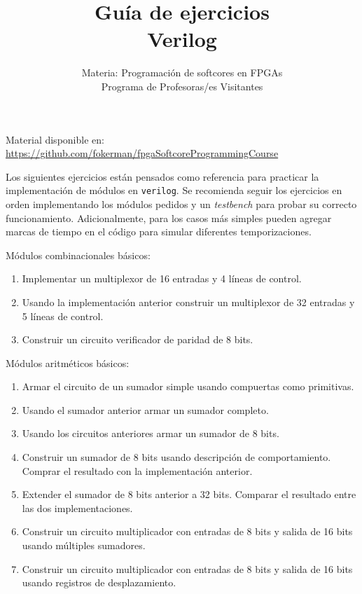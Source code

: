 \documentclass[a4paper,11pt]{article}
\title{Guía de ejercicios\\ 
\large{Verilog}}
\author{Materia: Programación de softcores en FPGAs\\
Programa de Profesoras/es Visitantes}
\date{}
\begin{document}
\maketitle

\begin{center}
    \scriptsize Material disponible en: \url{https://github.com/fokerman/fpgaSoftcoreProgrammingCourse}
\end{center}

\begin{notes}
Los siguientes ejercicios están pensados como referencia para practicar la implementación de módulos en \texttt{verilog}.
Se recomienda seguir los ejercicios en orden implementando los módulos pedidos y un \emph{testbench} para probar su correcto funcionamiento.
Adicionalmente, para los casos más simples pueden agregar marcas de tiempo en el código para simular diferentes temporizaciones.
\end{notes}

\bigskip

\begin{exercise}%
\noindent Módulos combinacionales básicos:
\begin{enumerate}
\setlength\itemsep{0cm}
\item Implementar un multiplexor de 16 entradas y 4 líneas de control.
\item Usando la implementación anterior construir un multiplexor de 32 entradas y 5 líneas de control.
\item Construir un circuito verificador de paridad de 8 bits.
\end{enumerate}
\end{exercise}

\begin{exercise}%
\noindent Módulos aritméticos básicos:
\begin{enumerate}
\setlength\itemsep{0cm}
\item Armar el circuito de un sumador simple usando compuertas como primitivas.
\item Usando el sumador anterior armar un sumador completo.
\item Usando los circuitos anteriores armar un sumador de 8 bits.
\item Construir un sumador de 8 bits usando descripción de comportamiento. Comprar el resultado con la implementación anterior.
\item Extender el sumador de 8 bits anterior a 32 bits. Comparar el resultado entre las dos implementaciones.
\item Construir un circuito multiplicador con entradas de 8 bits y salida de 16 bits usando múltiples sumadores.
\item Construir un circuito multiplicador con entradas de 8 bits y salida de 16 bits usando registros de desplazamiento.
\end{enumerate}
\end{exercise}
\end{document}
